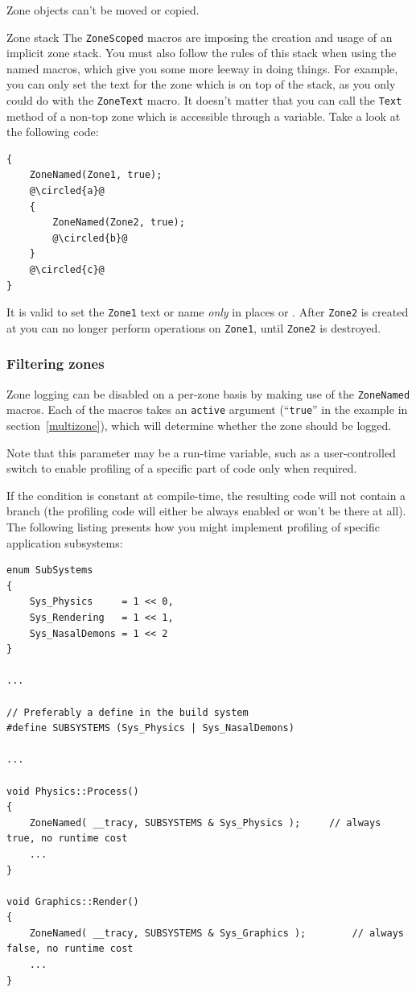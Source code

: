 \documentclass[hidelinks,titlepage,a4paper,twoside]{article}
\newcommand*\circled[1]{\tikz[baseline=(char.base)]{
    \node[shape=circle,draw,inner sep=1.5pt] (char) {#1};}}
\begin{document}
Zone objects can't be moved or copied.

\begin{bclogo}[
noborder=true,
couleur=black!5,
logo=\bcattention
]{Zone stack}
The \texttt{ZoneScoped} macros are imposing the creation and usage of an implicit zone stack. You must also follow the rules of this stack when using the named macros, which give you some more leeway in doing things. For example, you can only set the text for the zone which is on top of the stack, as you only could do with the \texttt{ZoneText} macro. It doesn't matter that you can call the \texttt{Text} method of a non-top zone which is accessible through a variable. Take a look at the following code:

\begin{lstlisting}
{
	ZoneNamed(Zone1, true);
	@\circled{a}@
	{
		ZoneNamed(Zone2, true);
		@\circled{b}@
	}
	@\circled{c}@
}
\end{lstlisting}

It is valid to set the \texttt{Zone1} text or name \emph{only} in places \circled{a} or \circled{c}. After \texttt{Zone2} is created at \circled{b} you can no longer perform operations on \texttt{Zone1}, until \texttt{Zone2} is destroyed.
\end{bclogo}

\subsubsection{Filtering zones}
\label{filteringzones}

Zone logging can be disabled on a per-zone basis by making use of the \texttt{ZoneNamed} macros. Each of the macros takes an \texttt{active} argument (\enquote{\texttt{true}} in the example in section~\ref{multizone}), which will determine whether the zone should be logged.

Note that this parameter may be a run-time variable, such as a user-controlled switch to enable profiling of a specific part of code only when required.

If the condition is constant at compile-time, the resulting code will not contain a branch (the profiling code will either be always enabled or won't be there at all). The following listing presents how you might implement profiling of specific application subsystems:

\begin{lstlisting}
enum SubSystems
{
	Sys_Physics		= 1 << 0,
	Sys_Rendering	= 1 << 1,
	Sys_NasalDemons	= 1 << 2
}

...

// Preferably a define in the build system
#define SUBSYSTEMS (Sys_Physics | Sys_NasalDemons)

...

void Physics::Process()
{
	ZoneNamed( __tracy, SUBSYSTEMS & Sys_Physics );		// always true, no runtime cost
	...
}

void Graphics::Render()
{
	ZoneNamed( __tracy, SUBSYSTEMS & Sys_Graphics );		// always false, no runtime cost
	...
}
\end{lstlisting}
\end{document}
